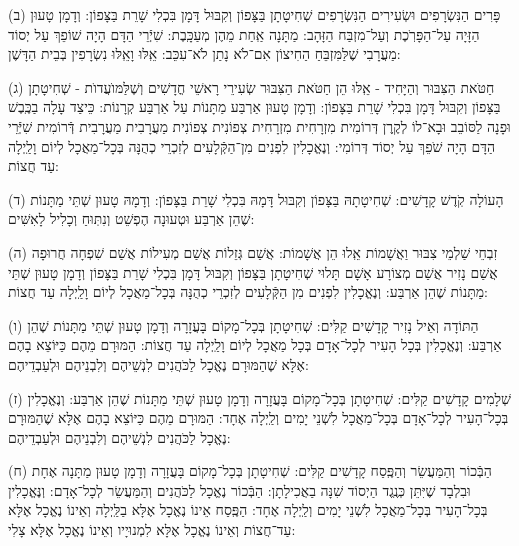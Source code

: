 \documentclass[twoside, openany, parskip=half, 11pt]{book}
\begin{document}
(ב) פָּרִים הַנִּשְׂרָפִים וּשְׂעִירִים הַנִּשְׂרָפִים שְׁחִיטָתָן בַּצָּפוֹן וְקִבּוּל דָּמָן בִּכְלִי שָׁרֵת בַּצָּפוֹן: וְדָמָן טָעוּן הַזָּיָה עַל־הַפָּרֹֽכֶת וְעַל־מִזְבַּח הַזָּהָב: מַתָּנָה אַֽחַת מֵהֶן מְעַכָּֽבֶת: שִׁיְֿרֵי הַדָּם הָיָה שׁוֹפֵךְ עַל יְסוֹד מַעֲרָבִי שֶׁלַּמִּזְבֵּחַ הַחִיצוֹן אִם־לֹא נָתַן לֹא־עִכֵּב: אֵֽלּוּ וָאֵֽלּוּ נִשְׂרָפִין בְּבֵית הַדָּשֶׁן: 
 
(ג) חַטֹּאת הַצִּבּוּר וְהַיָּחִיד - אֵֽלּוּ הֵן חַטֹּאת הַצִּבּוּר שְׂעִירֵי רָאשֵׁי חֳדָשִׁים וְשֶׁלַּמּוׁעֲדוׂת - שְׁחִיטָתָן בַּצָּפוֹן וְקִבּוּל דָּמָן בִּכְלִי שָׁרֵת בַּצָּפוֹן: וְדָמָן טָעוּן אַרְבַּע מַתָּנוֹת עַל אַרְבַּע קְרָנוֹת: כֵּיצַד עָלָה בַכֶּֽבֶשׁ וּפָנָה לַסּוֹבֵב וּבָא־לוֹ לְקֶֽרֶן דְּרוֹמִית מִזְרָחִית מִזְרָחִית צְפוֹנִית צְפוֹנִית מַעֲרָבִית מַעֲרָבִית דְּֿרוֹמִית שִׁיְּֿרֵי הַדָּם הָיָה שֹׁפֵךְ עַל יְסוֹד דְּרוֹמִי: וְנֶאֱכָלִין לִפְנִים מִן־הַקְּֿלָעִים לְזִכְרֵי כְהֻנָּה בְּכָל־מַאֲכָל לְיוֹם וָלַֽיְלָה עַד חֲצוֹת:

(ד) הָעוֹלָה קֹֽדֶשׁ קָדָשִׁים: שְׁחִיטָתָהּ בַּצָּפוֹן וְקִבּוּל דָּמָהּ בִּכְלִי שָׁרֵת בַּצָּפוֹן: וְדָמָהּ טָעוּן שְׁתֵּי מַתָּנוֹת שֶׁהֵן אַרְבַּע וּטְעוּנָה הֶפְשֵׁט וְנִתּֽוּחַ וְכָלִיל לָאִשִּׁים: 

(ה) זִבְחֵי שַׁלְמֵי צִבּוּר וַאֲשָׁמוֹת אֵֽלוּ הֵן אֲשָׁמוֹת: אֲשַׁם גְּזֵלוֹת אֲשַׁם מְעִילוֹת אֲשַׁם שִׁפְחָה חֲרוּפָה אֲשַׁם נָזִיר אֲשַׁם מְצוֹרָע אָשָׁם תָּלוּי שְׁחִיטָתָן בַּצָּפוֹן וְקִבּוּל דָּמָן בִּכְלִי שָׁרֵת בַּצָּפוֹן וְדָמָן טָעוּן שְׁתֵּי מַתָּנוֹת שֶׁהֵן אַרְבַּע: וְנֶאֱכָלִין לִפְנִים מִן הַקְּֿלָעִים לְזִכְרֵי כְהֻנָּה בְּכָל־מַאֲכָל לְיוֹם וָלַֽיְלָה עַד חֲצוֹת: 

(ו) הַתּוֹדָה וְאֵיל נָזִיר קָדָשִׁים קַלִּים: שְׁחִיטָתָן בְּכָל־מָקוֹם בָּעֲזָרָה וְדָמָן טָעוּן שְׁתֵּי מַתָּנוֹת שֶׁהֵן אַרְבַּע: וְנֶאֱכָלִין בְּכָל הָעִיר לְכָל־אָדָם בְּכָל מַאֲכָל לְיוֹם וָלַֽיְלָה עַד חֲצוֹת: הַמּוּרָם מֵהֶם כַּיּוֹצֵא בָהֶם אֶלָּא שֶׁהַמּוּרָם נֶאֱכָל לַכֹּהֲנִים לִנְשֵׁיהֶם וְלִבְנֵיהֶם וּלְעַבְדֵיהֶם: 

(ז) שְׁלָמִים קָדָשִׁים קַלִּים: שְׁחִיטָתָן בְּכָל־מָקוֹם בָּעֲזָרָה וְדָמָן טָעוּן שְׁתֵּי מַתָּנוֹת שֶׁהֵן אַרְבַּע: וְנֶאֱכָלִין בְּכָל־הָעִיר לְכָל־אָדָם בְּכָל־מַאֲכָל לִשְׁנֵי יָמִים וְלַֽיְלָה אֶחָד: הַמּוּרָם מֵהֶם כַּיּוֹצֵא בָהֶם אֶלָּא שֶׁהַמּוּרָם נֶאֱכָל לַכֹּהֲנִים לִנְשֵׁיהֶם וְלִבְנֵיהֶם וּלְעַבְדֵיהֶם: 

(ח) הַבְּֿכוֹר וְהַמַּעֲשֵׂר וְהַפֶּֽסַח קָדָשִׁים קַלִּים: שְׁחִיטָתָן בְּכָל־מָקוֹם בָּעֲזָרָה וְדָמָן טָעוּן מַתָּנָה אֶחָת וּבִלְבָד שֶׁיִּתֵּן כְּנֶֽגֶד הַיְסוֹד שִׁנָּה בַאֲכִילָתָן: הַבְּֿכוֹר נֶאֱכָל לַכֹּהֲנִים וְהַמַּעֲשֵׂר לְכָל־אָדָם: וְנֶּאֱכָלִין בְּכָל־הָעִיר בְּכָל־מַאֲכָל לִשְׁנֵי יָמִים וְלַֽיְלָה אֶחָד: הַפֶּֽסַח אֵינוֹ נֶאֱכָל אֶלָּא בַלַּֽיְלָה וְאֵינוֹ נֶאֱכָל אֶלָּא עַד־חֲצוֹת וְאֵינוֹ נֶאֱכָל אֶלָּא לִמְנוּיָיו וְאֵינוֹ נֶאֱכָל אֶלָּא צָלִי:
\end{document}
